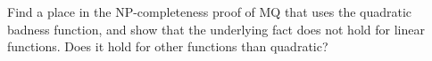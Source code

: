 Find a place in the NP-completeness proof of MQ that uses the
quadratic badness function, and show that the underlying fact does not
hold for linear functions. Does it hold for other functions than
quadratic?
